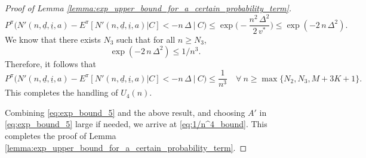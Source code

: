 \begin{proof}[Proof of Lemma \ref{lemma:exp_upper_bound_for_a_certain_probability_term}]
\begin{equation}
	P^\pi\bigg(N'(n, \underline{d}, \underline{i}, a)- E^\pi[N'(n, \underline{d}, \underline{i}, a)|C]<-n\,\Delta~\bigg|~C\bigg)\leq \exp\bigg(-\frac{n^2\,\Delta^2}{2\,v^*}\bigg)\leq \exp(-2\,n\,\Delta^2).
\end{equation}
We know that there exists $N_3$ such that for all $n\geq N_3$, $$\exp(-2\,n\,\Delta^2)\leq 1/n^3.$$
Therefore, it follows that $$ P^\pi\bigg(N'(n, \underline{d}, \underline{i}, a)- E^\pi[N'(n, \underline{d}, \underline{i}, a)|C]<-n\,\Delta~\bigg|~C\bigg)\leq \frac{1}{n^3}\quad \forall~n\geq \max\{N_2, N_3, M+3K+1\}. $$
{\color{black} This completes the handling of $U_4(n)$.}

{\color{black} Combining \eqref{eq:exp_bound_5} and the above result, and choosing $A'$ in \eqref{eq:exp_bound_5} large if needed, we arrive at \eqref{eq:1/n^4_bound}. This completes the proof of Lemma \ref{lemma:exp_upper_bound_for_a_certain_probability_term}.}
\end{proof}

